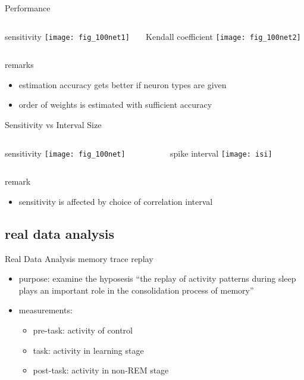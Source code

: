 \documentclass[fleqn,aspectratio=1610]{beamer}
\begin{document}
\begin{frame}[label={sec:org9fb2779}]{Performance}
\begin{columns}
\begin{column}{0.5\columnwidth}
\centering
sensitivity
\texttt{[image: fig\_100net1]}
\end{column}
\begin{column}{0.5\columnwidth}
\centering
Kendall coefficient
\texttt{[image: fig\_100net2]}
\end{column}
\end{columns}
\begin{alertblock}{remarks}
\begin{itemize}
\item estimation accuracy gets better if neuron types are given
\item order of weights is estimated with sufficient accuracy
\end{itemize}
\end{alertblock}
\end{frame}
\begin{frame}[label={sec:orga2d6faa}]{Sensitivity vs Interval Size}
\begin{columns}
\begin{column}{0.5\columnwidth}
\centering
sensitivity
\texttt{[image: fig\_100net]}
\end{column}
\begin{column}{0.5\columnwidth}
\centering
spike interval
\texttt{[image: isi]}
\end{column}
\end{columns}
\begin{alertblock}{remark}
\begin{itemize}
\item sensitivity is affected by choice of
correlation interval
\end{itemize}
\end{alertblock}
\end{frame}
\subsection{real data analysis}
\label{sec:org2a4bfac}
\begin{frame}[label={sec:orgefa45e8}]{Real Data Analysis}
memory trace replay
\parencites{WilsonMcNaughton1994,TatsunoLipaMcNaughton2006}

\begin{itemize}
\item purpose: 
examine the hyposesis ``the replay of activity patterns during sleep 
plays an important role in the consolidation process of memory''
\item measurements:
\begin{itemize}
\item pre-task: activity of control
\item task: activity in learning stage
\item post-task: activity in non-REM stage
\end{itemize}
\end{itemize}
\end{frame}
\end{document}
